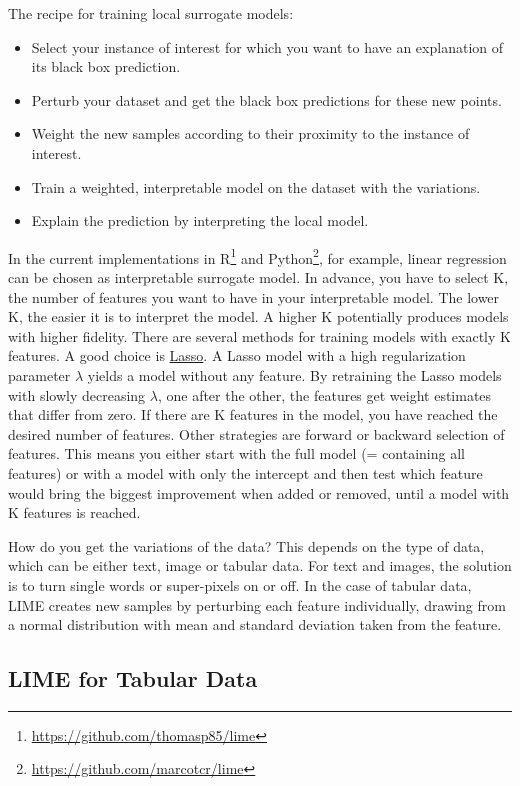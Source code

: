 \documentclass[
  12pt,
]{krantz}
\providecommand{\tightlist}{%
  \setlength{\itemsep}{0pt}\setlength{\parskip}{0pt}}
\renewcommand{\href}[2]{#2\footnote{\url{#1}}}
\begin{document}
The recipe for training local surrogate models:

\begin{itemize}
\tightlist
\item
  Select your instance of interest for which you want to have an explanation of its black box prediction.
\item
  Perturb your dataset and get the black box predictions for these new points.
\item
  Weight the new samples according to their proximity to the instance of interest.
\item
  Train a weighted, interpretable model on the dataset with the variations.
\item
  Explain the prediction by interpreting the local model.
\end{itemize}

In the current implementations in \href{https://github.com/thomasp85/lime}{R} and \href{https://github.com/marcotcr/lime}{Python}, for example, linear regression can be chosen as interpretable surrogate model.
In advance, you have to select K, the number of features you want to have in your interpretable model.
The lower K, the easier it is to interpret the model.
A higher K potentially produces models with higher fidelity.
There are several methods for training models with exactly K features.
A good choice is \protect\hyperlink{lasso}{Lasso}.
A Lasso model with a high regularization parameter \(\lambda\) yields a model without any feature.
By retraining the Lasso models with slowly decreasing \(\lambda\), one after the other, the features get weight estimates that differ from zero.
If there are K features in the model, you have reached the desired number of features.
Other strategies are forward or backward selection of features.
This means you either start with the full model (= containing all features) or with a model with only the intercept and then test which feature would bring the biggest improvement when added or removed, until a model with K features is reached.

How do you get the variations of the data?
This depends on the type of data, which can be either text, image or tabular data.
For text and images, the solution is to turn single words or super-pixels on or off.
In the case of tabular data, LIME creates new samples by perturbing each feature individually, drawing from a normal distribution with mean and standard deviation taken from the feature.

\hypertarget{lime-for-tabular-data}{%
\subsection{LIME for Tabular Data}\label{lime-for-tabular-data}}
\end{document}
